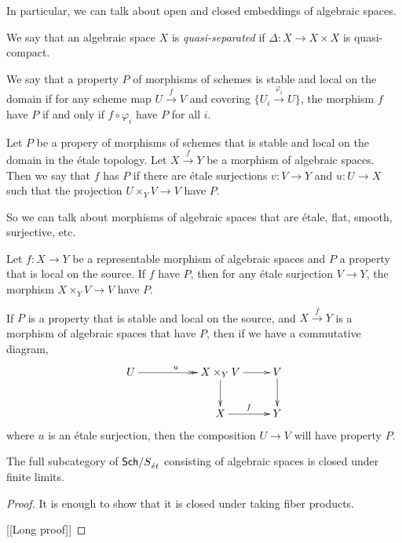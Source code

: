 \documentclass[11pt, english]{article}
\begin{document}
In particular, we can talk about open and closed embeddings of algebraic spaces.

\begin{defi}
We say that an algebraic space $X$ is \emph{quasi-separated} if $\Delta:X \to X \times X$ is quasi-compact.
\end{defi}

We say that a property $P$ of morphisms of schemes is stable and local on the domain if for any scheme map $U \xrightarrow{f} V$ and covering $\{ U_i \xrightarrow{\varphi_i} U\}$, the morphism $f$ have $P$ if and only if $f \circ \varphi_i$ have $P$ for all $i$.

\begin{defi}
Let $P$ be a propery of morphisms of schemes that is stable and local on the domain in the étale topology. Let $X \xrightarrow{f} Y$ be a morphism of algebraic spaces. Then we say that $f$ has $P$ if there are étale surjections $v: V \to Y$ and $u:U \to X$ such that the projection $U \times_Y V \to V$ have $P$.
\end{defi}

So we can talk about morphisms of algebraic spaces that are étale, flat, smooth, surjective, etc.

\begin{exc}
Let $f:X \to Y$ be a representable morphism of algebraic spaces and $P$ a property that is local on the source. If $f$ have $P$, then for any étale surjection $V \to Y$, the morphism $X \times_Y V \to V$ have $P$.
\end{exc}
\begin{sol}
\end{sol}

\begin{exc}
If $P$ is a property that is stable and local on the source, and $X \xrightarrow{f} Y$ is a morphism of algebraic spaces that have $P$, then if we have a commutative diagram,
\[
\xymatrix{
U \ar@{->>}[rr]^u && X \X_Y V \ar[r] \ar[d] & V \ar[d] \\
& & X \ar[r]^f & Y
}
\]
where $u$ is an étale surjection, then the composition $U \to V$ will have property $P$.
\end{exc}
\begin{sol}
\end{sol}

\begin{prop}
The full subcategory of ${\mathsf{Sch}/ S}_{\acute et}$ consisting of algebraic spaces is closed under finite limits.
\end{prop}
\begin{proof}
It is enough to show that it is closed under taking fiber products.

[[Long proof]]
\end{proof}
\end{document}

